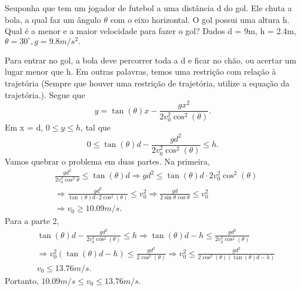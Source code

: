 \documentclass[PhysicsI/physics_notes.tex]{subfiles}
\begin{document}
\begin{example}
	Seuponha que tem um jogador de futebol a uma distância d do gol. Ele chuta a bola, a qual faz um ângulo $\theta $ com o
	eixo horizontal. O gol possui uma altura h. Qual é a menor e a maior velocidade para fazer o gol? Dados d = 9m, h = 2.4m, $\theta =30^{\circ}, g=9.8m/s^{2}.$

	Para entrar no gol, a bola deve percorrer toda a d e ficar no chão, ou acertar um lugar menor que h. Em outras palavras,
	temos uma restrição com relação à trajetória (Sempre que houver uma restrição de trajetória, utilize a equação da trajetória.).
	Segue que
	$$
		y = \tan{(\theta)}x - \frac{gx^{2}}{2v_{0}^{2}\cos^{2}{(\theta )}}.
	$$
	Em x = d, $0\leq y\leq h$, tal que
	$$
		0\leq \tan{(\theta)}d - \frac{gd^{2}}{2v_{0}^{2}\cos^{2}{(\theta )}}\leq h.
	$$
	Vamos quebrar o problema em duas partes. Na primeira,
	\begin{align*}
		 & \frac{gd^{2}}{2v_{0}^{2}\cos^{2}{\theta }}\leq \tan{(\theta )}d \Rightarrow gd^{2}\leq \tan{(\theta )}d \cdot 2v_{0}^{2}\cos^{2}{(\theta)}             \\
		 & \Rightarrow \frac{gd^{2}}{\tan{(\theta )}d \cdot 2\cos^{2}{(\theta )}}\leq v_{0}^{2} \Rightarrow  \frac{gd}{2\sin{\theta }\cos{\theta }}\leq v_{0}^{2} \\
		 & \Rightarrow v_{0}\geq 10.09m/s.
	\end{align*}
	Para a parte 2,
	\begin{align*}
		 & \tan{(\theta )}d - \frac{gd^{2}}{2v_{0}^{2}\cos^{2}{(\theta )}}\leq  h \Rightarrow \tan{(\theta )}d - h\leq \frac{gd^{2}}{2v_{0}^{2}\cos^{2}{(\theta )}}               \\
		 & \Rightarrow v_{0}^{2}(\tan{(\theta )}d - h)\leq \frac{gd^{2}}{2\cos^{2}{(\theta )}} \Rightarrow  v_{0}^{2}\leq \frac{gd^{2}}{2\cos^{2}{(\theta )}(\tan{(\theta )}d-h)} \\
		 & v_{0}\leq 13.76m/s.
	\end{align*}
	Portanto, $10.09m/s\leq v_{0}\leq 13.76m/s.$
\end{example}
\end{document}
